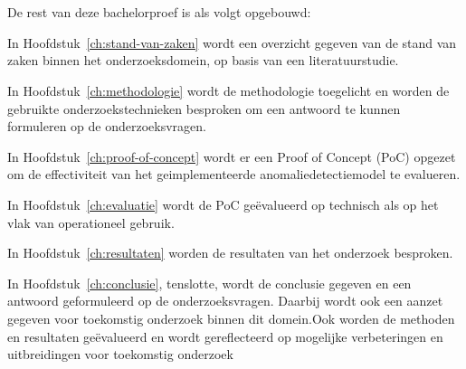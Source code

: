 \section{}%
\label{sec:opzet-bachelorproef}


De rest van deze bachelorproef is als volgt opgebouwd:

In Hoofdstuk~\ref{ch:stand-van-zaken} wordt een overzicht gegeven van de stand van zaken binnen het onderzoeksdomein, op basis van een literatuurstudie.

In Hoofdstuk~\ref{ch:methodologie} wordt de methodologie toegelicht en worden de gebruikte onderzoekstechnieken besproken om een antwoord te kunnen formuleren op de onderzoeksvragen.

In Hoofdstuk~\ref{ch:proof-of-concept} wordt er een Proof of Concept (PoC) opgezet om de effectiviteit van het geimplementeerde anomaliedetectiemodel te evalueren.

In Hoofdstuk~\ref{ch:evaluatie} wordt de PoC geëvalueerd op technisch als op het vlak van operationeel gebruik.

In Hoofdstuk~\ref{ch:resultaten} worden de resultaten van het onderzoek besproken.


In Hoofdstuk~\ref{ch:conclusie}, tenslotte, wordt de conclusie gegeven en een antwoord geformuleerd op de onderzoeksvragen. Daarbij wordt ook een aanzet gegeven voor toekomstig onderzoek binnen dit domein.Ook worden de methoden en resultaten geëvalueerd en wordt gereflecteerd op mogelijke verbeteringen en uitbreidingen voor toekomstig onderzoek